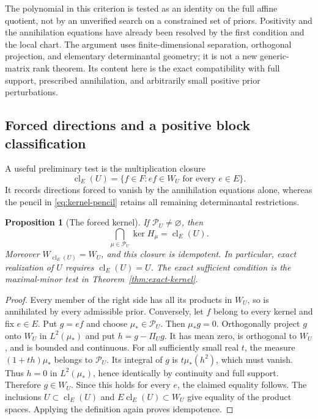 \documentclass[11pt]{amsart}
\newtheorem{proposition}[theorem]{Proposition}
\theoremstyle{definition}\newtheorem{definition}[theorem]{Definition}
\theoremstyle{remark}\newtheorem{remark}[theorem]{Remark}
\begin{document}
The polynomial in this criterion is tested as an identity on the full
affine quotient, not by an unverified search on a constrained set of
priors. Positivity and the annihilation equations have already been
resolved by the first condition and the local chart. The argument uses
finite-dimensional separation, orthogonal projection, and elementary
determinantal geometry; it is not a new generic-matrix rank theorem.
Its content here is the exact compatibility with full support, prescribed
annihilation, and arbitrarily small positive prior perturbations.

\subsection{Forced directions and a positive block classification}
A useful preliminary test is the multiplication closure
\begin{equation}\label{eq:kernel-closure}
 \operatorname{cl}_E(U)=\{f\in F: ef\in W_U\text{ for every }e\in E\}.
\end{equation}
It records directions forced to vanish by the annihilation equations
alone, whereas the pencil in \eqref{eq:kernel-pencil} retains all
remaining determinantal restrictions.

\begin{proposition}[The forced kernel]
\label{prop:forced-kernel}
If $\mathcal P_U\ne\varnothing$, then
\begin{equation}\label{eq:forced-kernel-intersection}
 \bigcap_{\mu\in\mathcal P_U}\ker H_\mu=\operatorname{cl}_E(U).
\end{equation}
Moreover $W_{\operatorname{cl}_E(U)}=W_U$, and this closure is
idempotent. In particular, exact realization of $U$ requires
$\operatorname{cl}_E(U)=U$. The exact sufficient condition is the
maximal-minor test in Theorem~\ref{thm:exact-kernel}.
\end{proposition}
\begin{proof}
Every member of the right side has all its products in $W_U$, so is
annihilated by every admissible prior. Conversely, let $f$ belong to
every kernel and fix $e\in E$. Put $g=ef$ and choose
$\mu_*\in\mathcal P_U$. Then $\mu_*g=0$. Orthogonally project $g$
onto $W_U$ in $L^2(\mu_*)$ and put $h=g-\Pi_U g$. It has mean
zero, is orthogonal to $W_U$, and is bounded and continuous. For all
sufficiently small real $t$, the measure $(1+th)\mu_*$ belongs to
$\mathcal P_U$. Its integral of $g$ is $t\mu_*(h^2)$, which must
vanish. Thus $h=0$ in $L^2(\mu_*)$, hence identically by continuity
and full support. Therefore $g\in W_U$. Since this holds for every
$e$, the claimed equality follows. The inclusions
$U\subset\operatorname{cl}_E(U)$ and
$E\operatorname{cl}_E(U)\subset W_U$ give equality of the product
spaces. Applying the definition again proves idempotence.
\end{proof}
\end{document}
